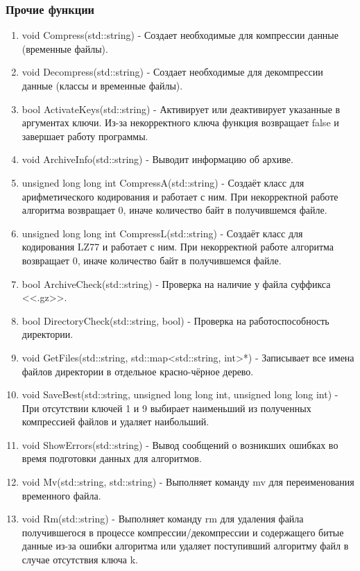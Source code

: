 \documentclass[12pt]{article}
\begin{document}
\subsubsection*{Прочие функции} 
\noindent
\begin{enumerate}
	\item void Compress(std::string) - Создает необходимые для компрессии данные (временные файлы).
	\item void Decompress(std::string) - Создает необходимые для декомпрессии данные (классы и временные файлы).
	\item bool ActivateKeys(std::string) - Активирует или деактивирует указанные в аргументах ключи. Из-за некорректного ключа функция возвращает false и завершает работу программы. 
	\item void ArchiveInfo(std::string) - Выводит информацию об архиве.
	\item unsigned long long int CompressA(std::string) - Создаёт класс для арифметического кодирования и работает с ним. При некорректной работе алгоритма возвращает 0, иначе количество байт в получившемся файле.
	\item unsigned long long int CompressL(std::string) - Создаёт класс для кодирования LZ77 и работает с ним. При некорректной работе алгоритма возвращает 0, иначе количество байт в получившемся файле.
	\item bool ArchiveCheck(std::string) - Проверка на наличие у файла суффикса <<.gz>>.
	\item bool DirectoryCheck(std::string, bool) - Проверка на работоспособность директории.
	\item void GetFiles(std::string, std::map<std::string, int>*) - Записывает все имена файлов директории в отдельное красно-чёрное дерево.
	\item void SaveBest(std::string, unsigned long long int, unsigned long long int) - При отсутствии ключей 1 и 9 выбирает наименьший из полученных компрессией файлов и удаляет наибольший.
	\item void ShowErrors(std::string) - Вывод сообщений о возникших ошибках во время подготовки данных для алгоритмов.
	\item void Mv(std::string, std::string) - Выполняет команду mv для переименования временного файла.
	\item void Rm(std::string) - Выполняет команду rm для удаления файла получившегося в процессе компрессии/декомпрессии и содержащего битые данные из-за ошибки алгоритма или удаляет поступивший алгоритму файл в случае отсутствия ключа k. 
		
\end{enumerate}
\end{document}
